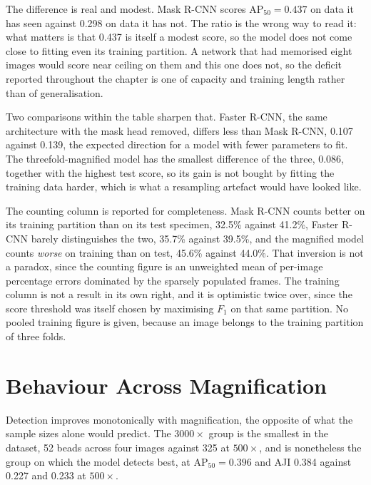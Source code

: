 
The difference is real and modest. Mask R-CNN scores $\mathrm{AP}_{50} = 0.437$ on data
it has seen against 0.298 on data it has not. The ratio is the wrong way to read
it: what matters is that 0.437 is itself a modest score, so the model does not
come close to fitting even its training partition. A network that had memorised
eight images would score near ceiling on them and this one does not, so the
deficit reported throughout the chapter is one of capacity and training length
rather than of generalisation.

Two comparisons within the table sharpen that. Faster R-CNN, the same architecture
with the mask head removed, differs less than Mask R-CNN, 0.107 against
0.139, the expected direction for a model with fewer parameters to fit. The
threefold-magnified model has the smallest difference of the three, 0.086, together with
the highest test score, so its gain is not bought by fitting the training data
harder, which is what a resampling artefact would have looked like.

The counting column is reported for completeness. Mask R-CNN counts better on its
training partition than on its test specimen, 32.5\% against 41.2\%, Faster R-CNN
barely distinguishes the two, 35.7\% against 39.5\%, and the magnified model
counts \emph{worse} on training than on test, 45.6\% against 44.0\%. That
inversion is not a paradox, since the counting figure is an unweighted mean of
per-image percentage errors dominated by the sparsely populated frames. The
training column is not a result in its own right, and it is optimistic twice over,
since the score threshold was itself chosen by maximising $F_1$ on that same
partition. No pooled training figure is given, because an image belongs to the
training partition of three folds.

\section{Behaviour Across Magnification}
\label{sec:magnification}



Detection improves monotonically with magnification, the opposite of what the
sample sizes alone would predict. The $3000\times$ group is the smallest in the
dataset, 52 beads across four images against 325 at $500\times$, and is
nonetheless the group on which the model detects best, at
$\mathrm{AP}_{50} = 0.396$ and AJI 0.384 against 0.227 and 0.233 at $500\times$.

